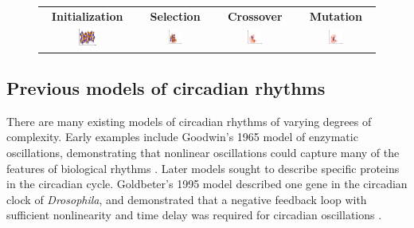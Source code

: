 \begin{figure}[tbp]
  \centering
  \begin{tabular}{cccc}
    \bf Initialization & \bf Selection & \bf Crossover & \bf Mutation \\
    \includegraphics[width=0.2\textwidth]{chap1/figures/ga_initialization.pdf} &
    \includegraphics[width=0.2\textwidth]{chap1/figures/ga_selection.pdf} &
    \includegraphics[width=0.2\textwidth]{chap1/figures/ga_crossover.pdf} &
    \includegraphics[width=0.2\textwidth]{chap1/figures/ga_mutation.pdf}\\
  \end{tabular}
  \label{fig:gaoverview}
\end{figure}

\subsection{Previous models of circadian rhythms}
There are many existing models of circadian rhythms of varying degrees of complexity. 
Early examples include Goodwin's 1965 model of enzymatic oscillations, demonstrating that nonlinear oscillations could capture many of the features of biological rhythms \cite{Goodwin1965}. 
Later models sought to describe specific proteins in the circadian cycle. 
Goldbeter's 1995 model described one gene in the circadian clock of {\it Drosophila}, and demonstrated that a negative feedback loop with sufficient nonlinearity and time delay was required for circadian oscillations \cite{Goldbeter1995}.

